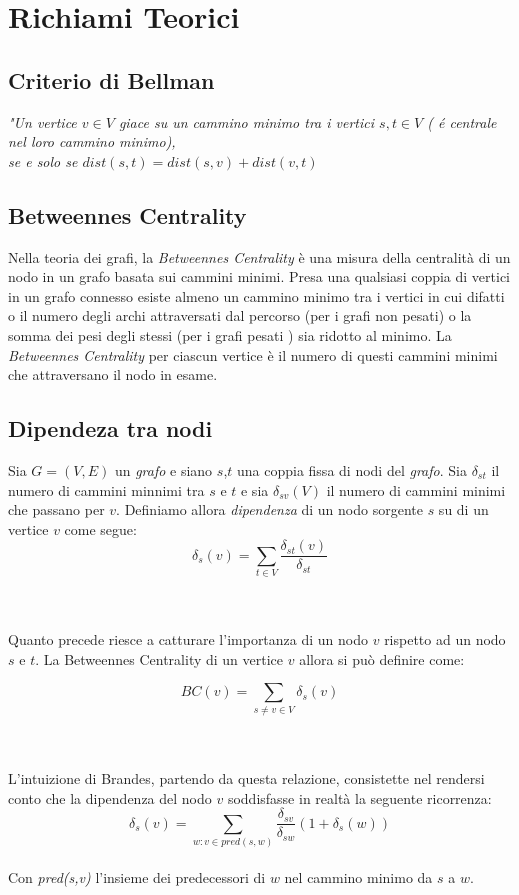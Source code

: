 \chapter{Richiami Teorici}
\section{Criterio di Bellman}
\begin{center}
	\emph{"Un vertice $v \in V$ giace su un cammino minimo tra i vertici $s,t \in V$ ( \'e centrale nel loro cammino minimo),\\ se e solo se $dist(s,t)=dist(s,v)+dist(v,t)$}\\
\end{center}

\section{Betweennes Centrality}
Nella teoria dei grafi, la \emph{Betweennes Centrality} è una misura della centralità di un nodo in un grafo basata sui cammini minimi. Presa una qualsiasi coppia di vertici in un grafo connesso esiste almeno un cammino minimo tra i vertici in cui difatti o il numero degli archi attraversati dal percorso (per i grafi non pesati) o la somma dei pesi degli stessi (per i grafi pesati ) sia ridotto al minimo. La \emph{Betweennes Centrality}  per ciascun vertice è il numero di questi cammini minimi che attraversano il nodo in esame.

\section{Dipendeza tra nodi}
Sia $G=(V,E)$ un \emph{grafo} e siano $s$,$t$ una coppia fissa di nodi del \emph{grafo}. Sia $\delta_{st} $ il numero di cammini minnimi tra $s$ e $t$ e sia $\delta_{sv}(V)$ il numero di cammini minimi che passano per $v$. Definiamo allora \emph{dipendenza} di un nodo sorgente $s$ su di un vertice $v$ come segue: \\
		$$
			\delta_s(v) = \sum_{t \in V}^{} \frac{\delta_{st}(v)}{\delta_{st}}
 		$$


\noindent \\ \\ Quanto precede riesce a catturare l'importanza di un nodo $v$ rispetto ad un nodo $s$ e $t$. La Betweennes Centrality di un vertice $v$ allora si può definire come:

$$
	BC(v) = \sum_{s\neq v \in V} \delta_s(v)
$$

\noindent \\ \\ L'intuizione di Brandes, partendo da questa relazione, consistette nel rendersi conto che la dipendenza del nodo $v$ soddisfasse in realtà la seguente ricorrenza:\\
$$
	\delta_s(v) = \sum_{w:v \in pred(s,w)} \frac{\delta_{sv}}{\delta_{sw}}(1 + \delta_s(w))
$$ 
\noindent	\\ Con \emph{pred(s,v)} l'insieme dei predecessori di $w$ nel cammino minimo da $s$ a $w$.